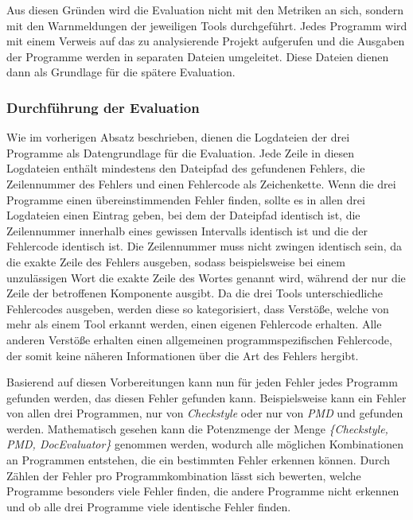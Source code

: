 Aus diesen Gründen wird die Evaluation nicht mit den Metriken an sich, sondern mit den Warnmeldungen der jeweiligen Tools durchgeführt. Jedes Programm wird mit einem Verweis auf das zu analysierende Projekt aufgerufen und die Ausgaben der Programme werden in separaten Dateien umgeleitet.  Diese Dateien dienen dann als Grundlage für die spätere Evaluation. 

\subsubsection{Durchführung der Evaluation}
Wie im vorherigen Absatz beschrieben, dienen die Logdateien der drei Programme als Datengrundlage für die Evaluation. Jede Zeile in diesen Logdateien enthält mindestens den Dateipfad des gefundenen Fehlers, die Zeilennummer des Fehlers und einen Fehlercode als Zeichenkette.  Wenn die drei Programme einen übereinstimmenden Fehler finden, sollte es in allen drei Logdateien einen Eintrag geben, bei dem der Dateipfad identisch ist, die Zeilennummer innerhalb eines gewissen Intervalls identisch ist und die der Fehlercode identisch ist. Die Zeilennummer muss nicht zwingen identisch sein, da  \checkpmd die exakte Zeile des Fehlers ausgeben, sodass beispielsweise bei einem unzulässigen Wort die exakte Zeile des Wortes genannt wird, während der \doceval nur die Zeile der betroffenen Komponente ausgibt. Da die drei Tools unterschiedliche Fehlercodes ausgeben, werden diese so kategorisiert, dass Verstöße, welche von mehr als einem Tool erkannt werden, einen eigenen Fehlercode erhalten. Alle anderen Verstöße erhalten einen allgemeinen programmspezifischen Fehlercode, der somit keine näheren Informationen über die Art des Fehlers hergibt.

Basierend auf diesen Vorbereitungen kann nun für jeden Fehler jedes Programm gefunden werden, das diesen Fehler gefunden kann. Beispielsweise kann ein Fehler von allen drei Programmen, nur von \textit{Checkstyle} oder nur von \textit{PMD} und \doceval gefunden werden. Mathematisch gesehen kann die Potenzmenge der Menge \textit{\{Checkstyle, PMD, DocEvaluator\}} genommen werden, wodurch alle möglichen Kombinationen an Programmen entstehen, die ein bestimmten Fehler erkennen können. Durch Zählen der Fehler pro Programmkombination lässt sich bewerten, welche Programme besonders viele Fehler finden, die andere Programme nicht erkennen und ob alle drei Programme viele identische Fehler finden. 


